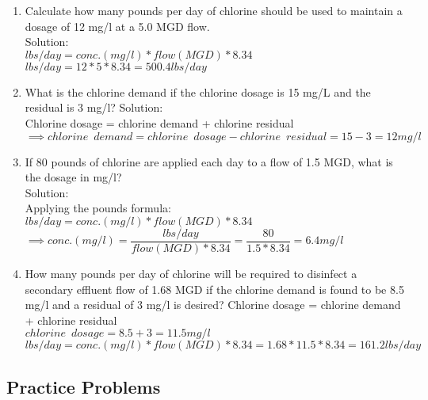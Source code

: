 \documentclass{article}
\begin{document}
\begin{enumerate}

\item Calculate how many pounds per day of chlorine should be used to maintain a dosage of 12 mg/l at a 5.0 MGD flow.\\
Solution:\\
$lbs/day=conc. (mg/l)*flow(MGD)*8.34$\\
$lbs/day=12*5*8.34=\boxed{500.4lbs/day}$\\
\item What is the chlorine demand if the chlorine dosage is 15 mg/L and the residual is 3 mg/l?
Solution:\\
Chlorine dosage = chlorine demand + chlorine residual\\
$\implies chlorine \enspace demand = chlorine \enspace dosage - chlorine \enspace residual=15-3=\boxed{12mg/l}$
\item If 80 pounds of chlorine are applied each day to a flow of 1.5 MGD, what is the dosage in mg/l?\\
Solution:\\
Applying the pounds formula:\\  $lbs/day=conc. (mg/l)*flow(MGD)*8.34$\\
$\implies conc. (mg/l)=\dfrac{lbs/day}{flow(MGD)*8.34}=\dfrac{80}{1.5*8.34}=\boxed{6.4mg/l}$
\item How many pounds per day of chlorine will be required to disinfect a secondary effluent flow of 1.68 MGD if the chlorine demand is found to be 8.5 mg/l and a residual of 3 mg/l is desired?
Chlorine dosage = chlorine demand + chlorine residual\\
$chlorine \enspace dosage=8.5+3=11.5mg/l$\\
$lbs/day=conc. (mg/l)*flow(MGD)*8.34=1.68*11.5*8.34=\boxed{161.2lbs/day}$\\


\end{enumerate}

\subsection{Practice Problems} 
\end{document}
